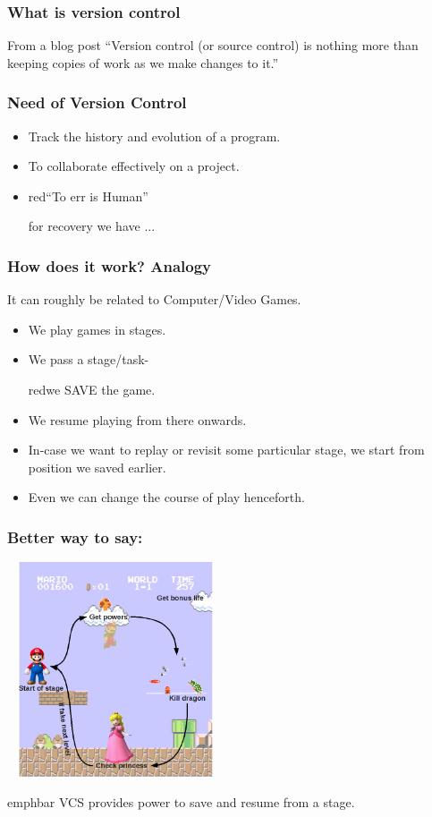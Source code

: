 \documentclass[14pt,compress]{beamer}
\newcommand{\emphbar}[1]
{\begin{beamercolorbox}[rounded=true]{emphbar} 
      {#1}
 \end{beamercolorbox}
}
\begin{document}
\begin{frame}
  \frametitle{What is version control}
  \begin{block}{From a blog post}
    ``Version control (or source control) is nothing more than keeping copies of work as we make changes to it.''
  \end{block}
\end{frame}

\begin{frame}[fragile]
  \frametitle{Need of Version Control}
  \begin{itemize}
  \item Track the history and evolution of a program.
  \item To collaborate effectively on a project.
  \item \begin{color}{red}``To err is Human''\end{color} for recovery we have ...
  \end{itemize}
\end{frame}

\begin{frame}[fragile]
  \frametitle{How does it work? Analogy}
  It can roughly be related to Computer/Video Games.
  \begin{itemize}
  \item We play games in stages.
  \item We pass a stage/task- \begin{color}{red}we SAVE the game.\end{color}
  \item We resume playing from there onwards.
  \item In-case we want to replay or revisit some particular stage, we start from position we saved earlier.
  \item Even we can change the course of play henceforth.
  \end{itemize}
\end{frame}

\begin{frame}[fragile]
  \frametitle{Better way to say:}
  \begin{center}
    \includegraphics[height=2.5in,width=2.5in, interpolate=true]{mario}
  \end{center}  
  \emphbar{VCS provides power to save and resume from a stage.}
\end{frame}
\end{document}
